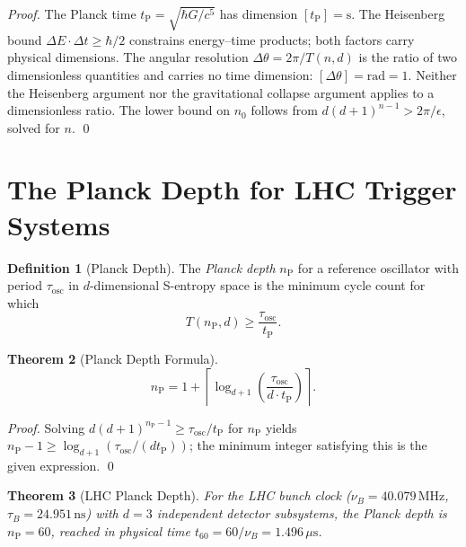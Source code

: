 \documentclass[twocolumn,10pt,a4paper]{article}
\theoremstyle{thmstyle}
\newtheorem{theorem}{Theorem}[section]
\theoremstyle{definition}
\newtheorem{definition}[theorem]{Definition}
\theoremstyle{remark}
\newcommand{\tP}{t_{\mathrm{P}}}
\newcommand{\nP}{n_{\mathrm{P}}}
\begin{document}
\begin{proof}
The Planck time $\tP = \sqrt{\hbar G/c^5}$ has dimension
$[\tP] = \mathrm{s}$. The Heisenberg bound $\Delta E \cdot \Delta t
\geq \hbar/2$ constrains energy--time products; both factors carry
physical dimensions. The angular resolution $\Delta\theta =
2\pi/T(n,d)$ is the ratio of two dimensionless quantities and carries
no time dimension: $[\Delta\theta] = \mathrm{rad} = 1$. Neither the
Heisenberg argument nor the gravitational collapse argument applies to
a dimensionless ratio. The lower bound on $n_0$ follows from
$d(d+1)^{n-1} > 2\pi/\epsilon$, solved for $n$. \qed
\end{proof}

\section{The Planck Depth for LHC Trigger Systems}
\label{sec:planck_depth}

\begin{definition}[Planck Depth]
\label{def:planck-depth}
The \emph{Planck depth} $\nP$ for a reference oscillator with period
$\tau_{\mathrm{osc}}$ in $d$-dimensional S-entropy space is the minimum
cycle count for which
\[
T(\nP, d) \geq \frac{\tau_{\mathrm{osc}}}{\tP}.
\]
\end{definition}

\begin{theorem}[Planck Depth Formula]
\label{thm:planck-depth}
\[
\nP = 1 + \left\lceil\log_{d+1}\!\left(\frac{\tau_{\mathrm{osc}}}{d\cdot\tP}\right)\right\rceil.
\]
\end{theorem}

\begin{proof}
Solving $d(d+1)^{\nP-1} \geq \tau_{\mathrm{osc}}/\tP$ for $\nP$
yields $\nP - 1 \geq \log_{d+1}(\tau_{\mathrm{osc}}/(d\tP))$; the
minimum integer satisfying this is the given expression. \qed
\end{proof}

\begin{theorem}[LHC Planck Depth]
\label{thm:lhc-planck-depth}
For the LHC bunch clock ($\nu_B = 40.079\,\mathrm{MHz}$,
$\tau_B = 24.951\,\mathrm{ns}$) with $d = 3$ independent detector
subsystems, the Planck depth is $\nP = 60$, reached in physical time
$t_{60} = 60/\nu_B = 1.496\,\mu\mathrm{s}$.
\end{theorem}
\end{document}
